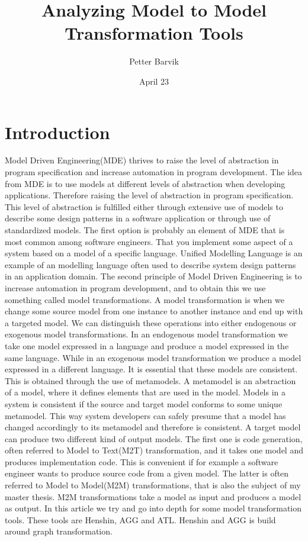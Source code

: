 \documentclass[pdftex,11pt,a4paper]{article}
\begin{document}
\title{Analyzing Model to Model Transformation
	   Tools}
\date{April 23}
\author{Petter Barvik}

\maketitle
\section{Introduction}

Model Driven Engineering(MDE)\cite{France2007} thrives to raise the level of abstraction in
program specification and increase automation in program development. The idea
from MDE is to use models at different levels of abstraction when developing
applications. Therefore raising the level of abstraction in program
specification. This level of abstraction is fulfilled either through extensive
use of models to describe some design patterns in a software application or
through use of standardized models. The first option is probably an element of
MDE that is most common among software engineers. That you implement some aspect
of a system based on a model of a specific language. Unified Modelling Language is
an example of an modelling language often used to describe system design
patterns in an application domain. The second principle of Model Driven
Engineering is to increase automation in program development, and to obtain this
we use something called model transformations. \linebreak 
\indent A model transformation is when we change some source model from one
instance to another instance and end up with a targeted model. We can
distinguish these operations into either endogenous or exogenous model
transformations. In an endogenous model transformation we take one model
expressed in a language and produce a model expressed in the same language.
While in an exogenous model transformation we produce a model expressed in a
different language. It is essential that these models are consistent. This is
obtained through the use of metamodels. A metamodel is an abstraction of a
model, where it defines elements that are used in the model. Models in a
system is consistent if the source and target model conforms to some unique 
metamodel. This way system developers can safely presume that a model has
changed accordingly to its metamodel and therefore is consistent. A target model
can produce two different kind of output models. The first one is code
generation, often referred to Model to Text(M2T) transformation, and it takes
one model and produces implementation code. This is convenient if for example a software
engineer wants to produce source code from a given model. The latter is often
referred to Model to Model(M2M) transformations, that is also the subject of
my master thesis. M2M transformations take a model as input and produces a model
as output. In this article we try and go into depth for some model
transformation tools. These tools are Henshin, AGG and ATL. Henshin and AGG is
build around graph transformation. 
\end{document}
